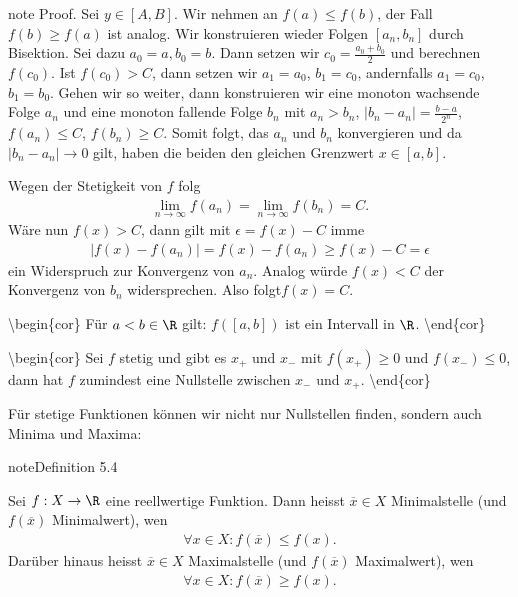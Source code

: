 \documentclass[letterpaper,10pt,english]{jupyterBook}
\begin{document}
\begin{sphinxadmonition}{note}
Proof.  Sei \(y \in [A,B]\). Wir nehmen an \(f(a) \leq f(b)\), der Fall \(f(b) \geq f(a)\) ist analog. Wir konstruieren wieder Folgen \([a_n,b_n]\) durch Bisektion. Sei dazu \(a_0=a, b_0=b\). Dann setzen wir \(c_0 = \frac{a_0+b_0}2\) und berechnen \(f(c_0)\). Ist \(f(c_0) > C\), dann setzen wir \(a_1=a_0\), \(b_1=c_0\), andernfalls \(a_1=c_0\), \(b_1=b_0\). Gehen wir so weiter, dann konstruieren wir eine monoton wachsende Folge \(a_n\) und eine monoton fallende Folge \(b_n\) mit \(a_n > b_n\), \(|b_n-a_n|=\frac{b-a}{2^n}\), \(f(a_n) \leq C\), \(f(b_n) \geq C\). Somit folgt, das \(a_n\) und \(b_n\) konvergieren und da \(|b_n-a_n|\rightarrow 0\) gilt, haben die beiden den gleichen Grenzwert \(x \in [a,b]\).

Wegen der Stetigkeit von \(f\) folg
\begin{equation*}
\begin{split} \lim_{n \rightarrow \infty} f(a_n) = \lim_{n \rightarrow \infty} f(b_n) = C.\end{split}
\end{equation*}
Wäre nun \(f(x) > C\), dann gilt mit \(\epsilon = f(x) - C\) imme
\begin{equation*}
\begin{split} |f(x) - f(a_n)| = f(x) - f(a_n) \geq f(x) - C = \epsilon\end{split}
\end{equation*}
ein Widerspruch zur Konvergenz von \(a_n\). Analog würde \(f(x) < C\) der Konvergenz von \(b_n\) widersprechen. Also folgt\(f(x) = C\).
\end{sphinxadmonition}

\textbackslash{}begin\{cor\}
Für \(a <b \in \R\) gilt: \(f([a,b])\) ist ein Intervall in \(\R\).
\textbackslash{}end\{cor\}

\textbackslash{}begin\{cor\}
Sei \(f\) stetig und gibt es \(x_+\) und \(x_-\) mit \(f(x_+) \geq 0\) und \(f(x_-) \leq 0\), dann hat \(f\) zumindest eine Nullstelle zwischen \(x_-\) und \(x_+\).
\textbackslash{}end\{cor\}

Für stetige Funktionen können wir nicht nur Nullstellen finden, sondern auch Minima und Maxima:
\label{stetigkeit/eigenschaften:definition-1}
\begin{sphinxadmonition}{note}{Definition 5.4}



Sei \(f: X \rightarrow \R\) eine reellwertige Funktion. Dann heisst \(\overline{x} \in X\) Minimalstelle (und \(f(\overline{x})\) Minimalwert), wen
\begin{equation*}
\begin{split} \forall x \in X: f(\overline{x}) \leq f(x).\end{split}
\end{equation*}
Darüber hinaus heisst \(\overline{x} \in X\) Maximalstelle (und \(f(\overline{x})\) Maximalwert), wen
\begin{equation*}
\begin{split} \forall x \in X: f(\overline{x}) \geq f(x).\end{split}
\end{equation*}\end{sphinxadmonition}
\end{document}
